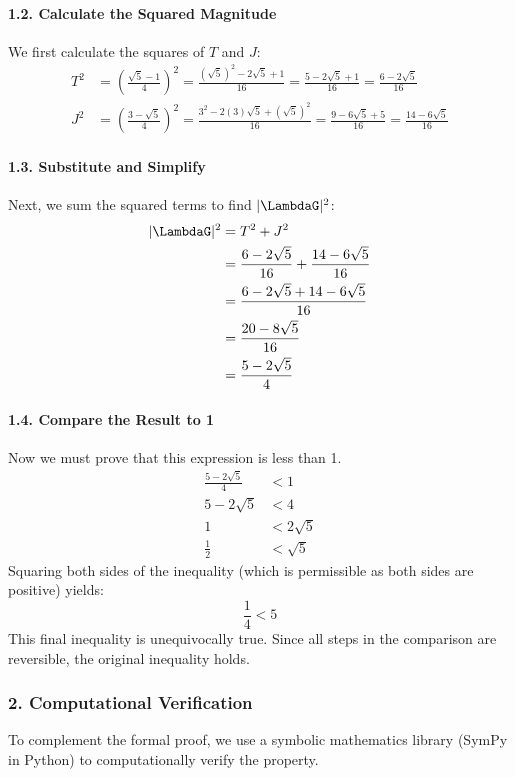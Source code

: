 \paragraph{1.2. Calculate the Squared Magnitude}
We first calculate the squares of $T$ and $J$:
\begin{align*}
T^2 &= \left(\frac{\sqrt{5}-1}{4}\right)^2 = \frac{(\sqrt{5})^2 - 2\sqrt{5} + 1}{16} = \frac{5 - 2\sqrt{5} + 1}{16} = \frac{6 - 2\sqrt{5}}{16} \\
J^2 &= \left(\frac{3-\sqrt{5}}{4}\right)^2 = \frac{3^2 - 2(3)\sqrt{5} + (\sqrt{5})^2}{16} = \frac{9 - 6\sqrt{5} + 5}{16} = \frac{14 - 6\sqrt{5}}{16}
\end{align*}

\paragraph{1.3. Substitute and Simplify}
Next, we sum the squared terms to find $|\LambdaG|^2$:
\begin{align*}
|\LambdaG|^2 &= T^2 + J^2 \\
&= \frac{6 - 2\sqrt{5}}{16} + \frac{14 - 6\sqrt{5}}{16} \\
&= \frac{6 - 2\sqrt{5} + 14 - 6\sqrt{5}}{16} \\
&= \frac{20 - 8\sqrt{5}}{16} \\
&= \frac{5 - 2\sqrt{5}}{4}
\end{align*}

\paragraph{1.4. Compare the Result to 1}
Now we must prove that this expression is less than 1.
\begin{align*}
\frac{5 - 2\sqrt{5}}{4} &< 1 \\
5 - 2\sqrt{5} &< 4 \\
1 &< 2\sqrt{5} \\
\frac{1}{2} &< \sqrt{5}
\end{align*}
Squaring both sides of the inequality (which is permissible as both sides are positive) yields:
$$ \frac{1}{4} < 5 $$
This final inequality is unequivocally true. Since all steps in the comparison are reversible, the original inequality holds.

\subsubsection*{2. Computational Verification}
To complement the formal proof, we use a symbolic mathematics library (SymPy in Python) to computationally verify the property.

